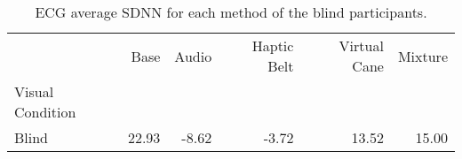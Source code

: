 
\begin{table}[!htb]
\centering
\caption{ECG average SDNN for each method of the blind participants.}
\label{tab:sdnn_average_group_blind}
\begin{tabular}{lrrrrr}
\toprule
{} &   Base &  Audio & Haptic Belt & Virtual Cane & Mixture \\
Visual Condition &        &        &             &              &         \\
\midrule
Blind            &  22.93 &  -8.62 &       -3.72 &        13.52 &   15.00 \\
\bottomrule
\end{tabular}
\end{table}

